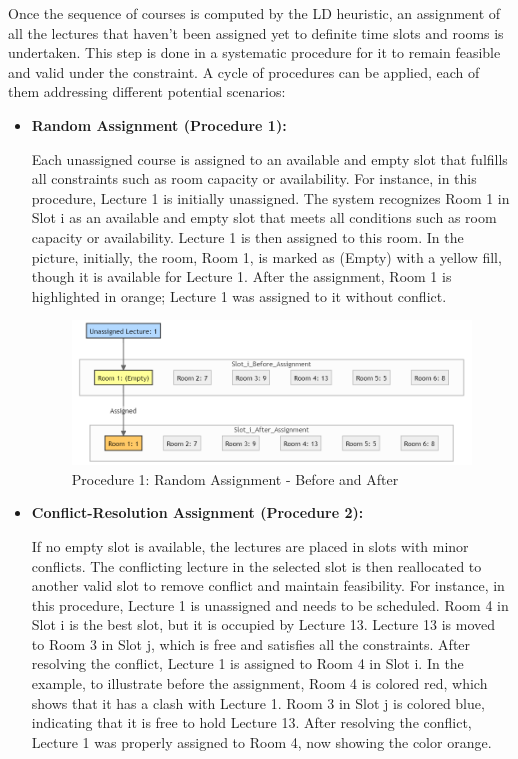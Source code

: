 Once the sequence of courses is computed by the LD heuristic, an assignment of all the lectures that haven't been assigned yet to definite time slots and rooms is undertaken. This step is done in a systematic procedure for it to remain feasible and valid under the constraint. A cycle of procedures can be applied, each of them addressing different potential scenarios:
    
\begin{itemize}
    \item[] \textbf{Random Assignment (Procedure 1):}  

    Each unassigned course is assigned to an available and empty slot that fulfills all constraints such as room capacity or availability. For instance, in this procedure, Lecture 1 is initially unassigned. The system recognizes Room 1 in Slot i as an available and empty slot that meets all conditions such as room capacity or availability. Lecture 1 is then assigned to this room. In the picture, initially, the room, Room 1, is marked as (Empty) with a yellow fill, though it is available for Lecture 1. After the assignment, Room 1 is highlighted in orange; Lecture 1 was assigned to it without conflict.

    \begin{figure}[H]
        \centering
        \includegraphics[width=1\textwidth]{procedure1_random_assignment.png}
        \caption{Procedure 1: Random Assignment - Before and After}
        \label{fig:random_assignment}
    \end{figure}

    \item[] \textbf{Conflict-Resolution Assignment (Procedure 2):}  
    
    If no empty slot is available, the lectures are placed in slots with minor conflicts. The conflicting lecture in the selected slot is then reallocated to another valid slot to remove conflict and maintain feasibility. For instance, in this procedure, Lecture 1 is unassigned and needs to be scheduled. Room 4 in Slot i is the best slot, but it is occupied by Lecture 13. Lecture 13 is moved to Room 3 in Slot j, which is free and satisfies all the constraints. After resolving the conflict, Lecture 1 is assigned to Room 4 in Slot i. In the example, to illustrate before the assignment, Room 4 is colored red, which shows that it has a clash with Lecture 1. Room 3 in Slot j is colored blue, indicating that it is free to hold Lecture 13. After resolving the conflict, Lecture 1 was properly assigned to Room 4, now showing the color orange.


\end{itemize}
